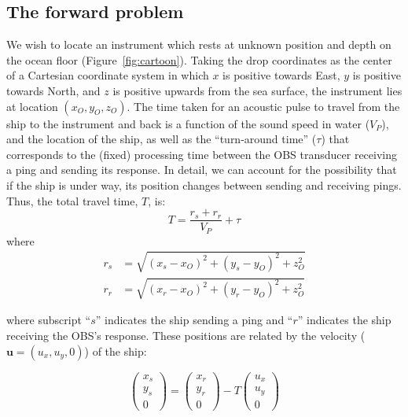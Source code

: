 

\subsection{The forward problem}

We wish to locate an instrument which rests at unknown position and depth on the ocean floor (Figure~\ref{fig:cartoon}). Taking the drop coordinates as the center of a Cartesian coordinate system in which $x$ is positive towards East, $y$ is positive towards North, and $z$ is positive upwards from the sea surface, the instrument lies at location $(x_O,y_O,z_O)$. The time taken for an acoustic pulse to travel from the ship to the instrument and back is a function of the sound speed in water ($V_P$), and the location of the ship, as well as the ``turn-around time'' ($\tau$) that corresponds to the (fixed) processing time between the OBS transducer receiving a ping and sending its response. In detail, we can account for the possibility that if the ship is under way, its position changes between sending and receiving pings. Thus, the total travel time, $T$, is:
\begin{equation}
T = \frac{r_s + r_r}{V_P} + \tau \label{eq:forward_send_receive}
\end{equation}
where
\begin{align}
	r_s &= \sqrt{(x_s - x_O)^2 + (y_s - y_O)^2 + z_O^2}\\
	r_r &= \sqrt{(x_r - x_O)^2 + (y_r - y_O)^2 + z_O^2}
\end{align}

where subscript ``$s$'' indicates the ship sending a ping and ``$r$'' indicates the ship receiving the OBS's response. These positions are related by the velocity ($\mathbf{u} = (u_x,u_y,0)$) of the ship:

\begin{equation}
\begin{pmatrix} x_s\\y_s\\0 \end{pmatrix} = \begin{pmatrix} x_r\\y_r\\0 \end{pmatrix} - T\begin{pmatrix} u_x\\u_y\\0 \end{pmatrix}
\end{equation}

